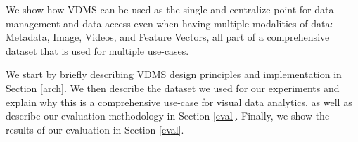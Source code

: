 We show how VDMS can be used as the single and centralize point for data
management and data access even when having multiple modalities of data:
Metadata, Image, Videos, and Feature Vectors, all part of a comprehensive
dataset that is used for multiple use-cases.

We start by briefly describing VDMS design principles and implementation
in Section \ref{arch}.
We then describe the dataset we used for our experiments and explain
why this is a comprehensive use-case for visual data analytics, as well as
describe our evaluation methodology in Section \ref{eval}.
Finally, we show the results of our evaluation in Section \ref{eval}.
